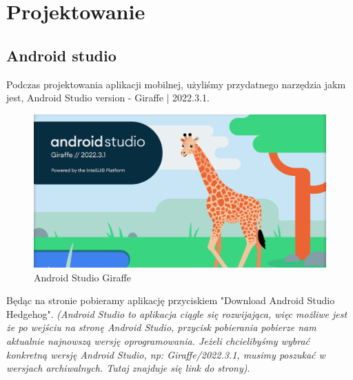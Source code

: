 	\newpage
\section{Projektowanie}		%
\subsection{Android studio}

\hspace{0.60 cm}Podczas projektowania aplikacji mobilnej, użyliśmy przydatnego narzędzia jakm jest, Android Studio\cite{www1} version - Giraffe | 2022.3.1.
\begin{figure}[!hbt]
	\begin{center}
		\includegraphics[width=\textwidth]{rys/giraffe.png}
		\caption{Android Studio Giraffe}
		\label{rys:Android-studio-Giraffe}
	\end{center}
\end{figure}

Będąc na stronie pobieramy aplikację przyciskiem "Download Android Studio Hedgehog".\textit{ (Android Studio to aplikacja ciągle się rozwijająca, więc możliwe jest że po wejściu na stronę Android Studio, przycisk pobierania pobierze nam aktualnie najnowszą wersję oprogramowania. Jeżeli chcielibyśmy wybrać konkretną wersję Android Studio, np: Giraffe/2022.3.1, musimy poszukać w wersjach archiwalnych. Tutaj znajduje się link do strony)}\cite{www2}.
	
